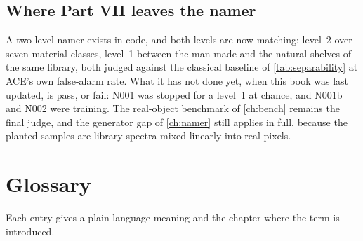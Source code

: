 \documentclass[11pt,a4paper,oneside,openany]{book}
\begin{document}
\section{Where Part VII leaves the namer}

A two-level namer exists in code, and both levels are now matching: level~2 over seven material classes, level~1 between the man-made and the natural shelves of the same
library, both judged against the classical baseline of \cref{tab:separability} at ACE's own false-alarm rate. What it has not done yet, when this book was last updated, is pass,
or fail: N001 was stopped for a level~1 at chance, and N001b and N002 were training. The real-object benchmark of \cref{ch:bench} remains the final judge, and the generator gap
of \cref{ch:namer} still applies in full, because the planted samples are library spectra mixed linearly into real pixels.

\backmatter

\chapter{Glossary}
\label{ch:glossary}

Each entry gives a plain-language meaning and the chapter where the term is introduced.
\end{document}
